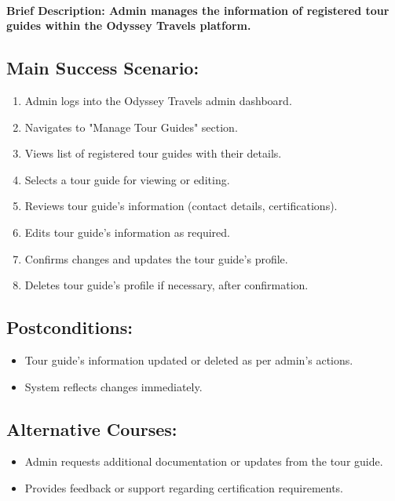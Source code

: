 \documentclass{scrreprt}
\begin{document}
\paragraph {\textnormal{Brief Description: 
Admin manages the information of registered tour guides within the Odyssey Travels platform.}}

\subsection*{\textbf{Main Success Scenario:}}

\begin{enumerate}
    \item Admin logs into the Odyssey Travels admin dashboard.
    \item Navigates to "Manage Tour Guides" section.
    \item Views list of registered tour guides with their details.
    \item Selects a tour guide for viewing or editing.
    \item Reviews tour guide's information (contact details, certifications).
    \item Edits tour guide's information as required.
    \item Confirms changes and updates the tour guide's profile.
    \item Deletes tour guide's profile if necessary, after confirmation.
\end{enumerate}

\subsection*{\textbf{Postconditions:}}

\begin{itemize}
    \item Tour guide's information updated or deleted as per admin's actions.
    \item System reflects changes immediately.
\end{itemize}

\subsection*{\textbf{Alternative Courses:}}

\begin{itemize}
    \item Admin requests additional documentation or updates from the tour guide.
    \item Provides feedback or support regarding certification requirements.
\end{itemize}
\end{document}
